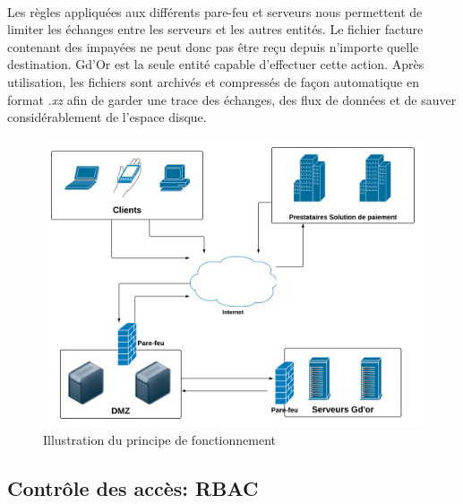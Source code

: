 	  \paragraph{}
	  	Les r\`egles appliqu\'ees aux diff\'erents pare-feu et serveurs nous permettent de limiter les \'echanges entre les serveurs et les autres entit\'es. Le fichier facture contenant des impay\'ees ne peut donc pas \^etre re\c{c}u depuis n'importe quelle destination. Gd'Or est la seule entit\'e capable d'effectuer cette action. Apr\`es utilisation, les fichiers sont archiv\'es et compressés de façon automatique en format \textit{.xz} afin de garder une trace des \'echanges, des flux de donn\'ees et de sauver consid\'erablement de l'espace disque.
	  	
	  		  	
		\begin{figure}[H]
		     \begin{center}
			\includegraphics[scale=0.5]{images/fonctionnement.png}
		     \end{center}
		     \caption{Illustration du principe de fonctionnement}
		     \label{Diagramme de cas d'utilisation}
		\end{figure}
		
		
  \subsection{Contr\^ole des acc\`es: RBAC}
